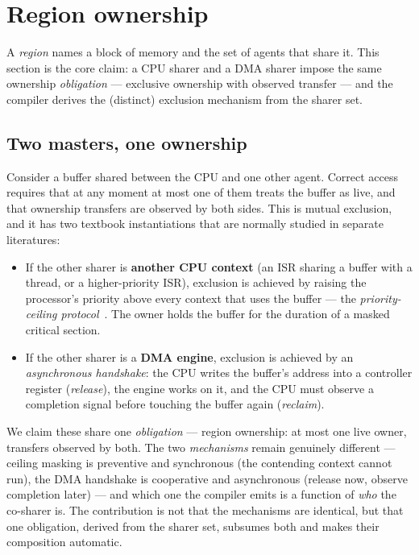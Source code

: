 \documentclass[10pt,twocolumn]{article}
\begin{document}
\section{Region ownership}
\label{sec:ownership}

A \emph{region} names a block of memory and the set of agents that share it.
This section is the core claim: a CPU sharer and a DMA sharer impose the same
ownership \emph{obligation} --- exclusive ownership with observed transfer --- and
the compiler derives the (distinct) exclusion mechanism from the sharer set.

\subsection{Two masters, one ownership}

Consider a buffer shared between the CPU and one other agent. Correct access
requires that at any moment at most one of them treats the buffer as live, and
that ownership transfers are observed by both sides. This is mutual exclusion,
and it has two textbook instantiations that are normally studied in separate
literatures:

\begin{itemize}
\item If the other sharer is \textbf{another CPU context} (an ISR sharing a
buffer with a thread, or a higher-priority ISR), exclusion is achieved by
raising the processor's priority above every context that uses the buffer --- the
\emph{priority-ceiling protocol}~\cite{baker1991}. The owner holds the buffer
for the duration of a masked critical section.

\item If the other sharer is a \textbf{DMA engine}, exclusion is achieved by an
\emph{asynchronous handshake}: the CPU writes the buffer's address into a
controller register (\emph{release}), the engine works on it, and the CPU must
observe a completion signal before touching the buffer again (\emph{reclaim}).
\end{itemize}

We claim these share one \emph{obligation} --- region ownership: at most one live
owner, transfers observed by both. The two \emph{mechanisms} remain genuinely
different --- ceiling masking is preventive and synchronous (the contending
context cannot run), the DMA handshake is cooperative and asynchronous (release
now, observe completion later) --- and which one the compiler emits is a function
of \emph{who} the co-sharer is. The contribution is not that the mechanisms are
identical, but that one obligation, derived from the sharer set, subsumes both
and makes their composition automatic.
\end{document}
